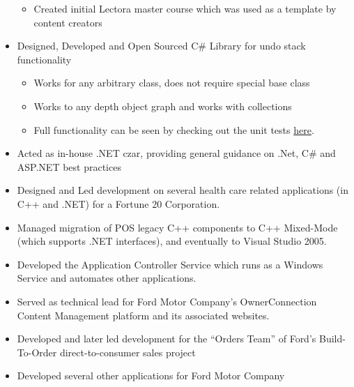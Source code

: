 \documentclass[12pt,letterpaper,sans]{moderncv}
\begin{document}
\begin{itemize}[leftmargin=1.24in]
\begin{itemize}
                \item Created initial Lectora master course which was used as a template by content creators
            \end{itemize}
        \item Designed, Developed and Open Sourced C\# Library for undo stack functionality
            \begin{itemize}
                \item Works for any arbitrary class, does not require special base class
                \item Works to any depth object graph and works with collections
                \item Full functionality can be seen by checking out the unit tests \href{https://github.com/jasallen/ShadowedObjects/blob/master/ShadowedObjectsTests/UnitTest1.cs}{here}.
            \end{itemize}
        \item Acted as in-house .NET czar, providing general guidance on .Net, C\# and ASP.NET best practices
    \end{itemize}
    \begin{itemize}[leftmargin=1.24in]
        \item Designed and Led development on several health care related applications (in C++ and .NET) for a Fortune 20 Corporation.
        \item Managed migration of POS legacy C++ components to C++ Mixed-Mode (which supports .NET interfaces), and eventually to Visual Studio 2005.
        \item Developed the Application Controller Service which runs as a Windows Service and automates other applications.
    \end{itemize}
    \begin{itemize}[leftmargin=1.24in]
        \item Served as technical lead for Ford Motor Company's OwnerConnection Content Management platform and its associated websites.  
        \item Developed and later led development for the ``Orders Team'' of Ford's Build-To-Order direct-to-consumer sales project
        \item Developed several other applications for Ford Motor Company
    \end{itemize}
\end{document}
